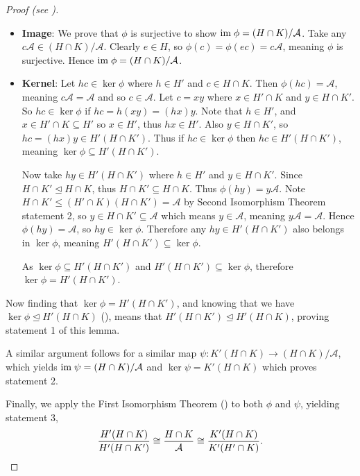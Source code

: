 \begin{proof}[Proof (see {\cite[Lemma I.8.9]{hungerford_1980}})]
\begin{itemize}
        \item \textbf{Image}: We prove that $\phi$ is surjective to show $\mathrm{im}\; \phi = (H\cap K)/\mathcal{A}$. Take any $c\mathcal{A} \in (H\cap K) / \mathcal{A}$. Clearly $e \in H$, so $\phi(c) = \phi(ec) = c\mathcal{A}$, meaning $\phi$ is surjective. Hence $\mathrm{im}\; \phi = (H\cap K)/\mathcal{A}$.

        \item \textbf{Kernel}: Let $hc \in \ker\phi$ where $h \in H'$ and $c \in H \cap K$. Then $\phi(hc) = \mathcal{A}$, meaning $c\mathcal{A} = \mathcal{A}$ and so $c \in \mathcal{A}$. Let $c = xy$ where $x \in H'\cap K$ and $y \in H \cap K'$. So $hc \in \ker\phi$ if $hc = h(xy) = (hx)y$. Note that $h \in H'$, and $x \in H' \cap K \subseteq H'$ so $x \in H'$, thus $hx \in H'$. Also $y \in H \cap K'$, so $hc = (hx)y \in H'(H \cap K')$. Thus if $hc \in \ker\phi$ then $hc \in H'(H \cap K')$, meaning $\ker\phi \subseteq H'(H \cap K')$.

        Now take $hy \in H'(H \cap K')$ where $h \in H'$ and $y \in H \cap K'$. Since $H \cap K' \unlhd H \cap K$, thus $H \cap K' \subseteq H \cap K$. Thus $\phi(hy) = y\mathcal{A}$. Note $H \cap K' \leq (H' \cap K)(H \cap K') = \mathcal{A}$ by Second Isomorphism Theorem statement 2, so $y \in H \cap K' \subseteq \mathcal{A}$ which means $y \in \mathcal{A}$, meaning $y\mathcal{A} = \mathcal{A}$. Hence $\phi(hy) = \mathcal{A}$, so $hy \in \ker\phi$. Therefore any $hy \in H'(H \cap K')$ also belongs in $\ker\phi$, meaning $H'(H \cap K') \subseteq \ker\phi$.

        As $\ker\phi \subseteq H'(H\cap K')$ and $H'(H\cap K') \subseteq \ker\phi$, therefore $\ker\phi = H'(H \cap K')$.
    \end{itemize}

    Now finding that $\ker\phi = H'(H \cap K')$, and knowing that we have $\ker\phi \unlhd H'(H\cap K)$ (), means that $H'(H \cap K') \unlhd H'(H\cap K)$, proving statement 1 of this lemma.

    A similar argument follows for a similar map $\psi: K'(H\cap K) \to (H\cap K)/\mathcal{A}$, which yields $\mathrm{im}\;\psi = (H\cap K)/\mathcal{A}$ and $\ker\psi = K'(H\cap K)$ which proves statement 2.

    Finally, we apply the First Isomorphism Theorem () to both $\phi$ and $\psi$, yielding statement 3,
    \[
        \frac{H'(H\cap K)}{H'(H\cap K')} \cong \frac{H\cap K}{\mathcal{A}} \cong \frac{K'(H\cap K)}{K'(H'\cap K)}.\qedhere
    \]
\end{proof}

